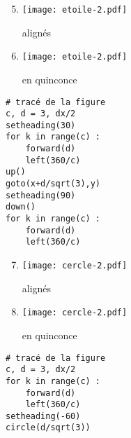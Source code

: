 \documentclass[11pt,a4paper]{article}
\begin{document}
\noindent\begin{minipage}[t]{5cm}
\begin{enumerate}\setcounter{enumi}{4}
\item \begin{minipage}{1.75cm}\texttt{[image: etoile-2.pdf]}\end{minipage} alignés
\item \begin{minipage}{1.75cm}\texttt{[image: etoile-2.pdf]}\end{minipage} en quinconce
\end{enumerate}
\end{minipage}
\hfill
\begin{minipage}[t]{7cm}\footnotesize
\begin{Verbatim}
# tracé de la figure
c, d = 3, dx/2
setheading(30)
for k in range(c) :
    forward(d)
    left(360/c)
up()
goto(x+d/sqrt(3),y)
setheading(90)
down()
for k in range(c) :
    forward(d)
    left(360/c)
\end{Verbatim}
\end{minipage}
\vspace*{5mm}


\noindent\begin{minipage}[t]{5cm}
\begin{enumerate}\setcounter{enumi}{6}
\item \begin{minipage}{1.75cm}\texttt{[image: cercle-2.pdf]}\end{minipage} alignés
\item \begin{minipage}{1.75cm}\texttt{[image: cercle-2.pdf]}\end{minipage} en quinconce
\end{enumerate}
\end{minipage}
\hfill
\begin{minipage}[t]{7cm}\footnotesize
\begin{Verbatim}
# tracé de la figure
c, d = 3, dx/2
for k in range(c) :
    forward(d)
    left(360/c)
setheading(-60)
circle(d/sqrt(3))
\end{Verbatim}
\end{minipage}
\vspace*{5mm}
\end{document}
